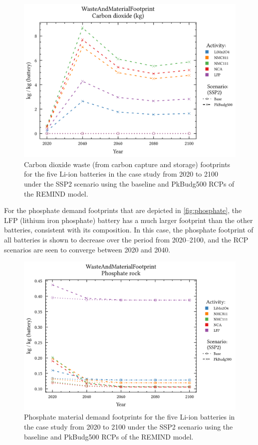 \begin{figure}[H]
    \centering
    \includegraphics[width=\linewidth]{figures/carbondioxide.png}
    \caption{Carbon dioxide waste (from carbon capture and storage) footprints for the five Li-ion batteries in the case study from 2020 to 2100 under the SSP2 scenario using the baseline and PkBudg500 RCPs of the REMIND model.}\label{fig:carbondioxide}
\end{figure}

For the phosphate demand footprints that are depicted in \autoref{fig:phosphate}, the LFP (lithium iron phosphate) battery has a much larger footprint than the other batteries, consistent with its composition. In this case, the phosphate footprint of all batteries is shown to decrease over the period from 2020--2100, and the RCP scenarios are seen to converge between 2020 and 2040.

\begin{figure}[H]
    \centering
    \includegraphics[width=\linewidth]{figures/phosphate.png}
    \caption{Phosphate material demand footprints for the five Li-ion batteries in the case study from 2020 to 2100 under the SSP2 scenario using the baseline and PkBudg500 RCPs of the REMIND model.}\label{fig:phosphate}
\end{figure}

